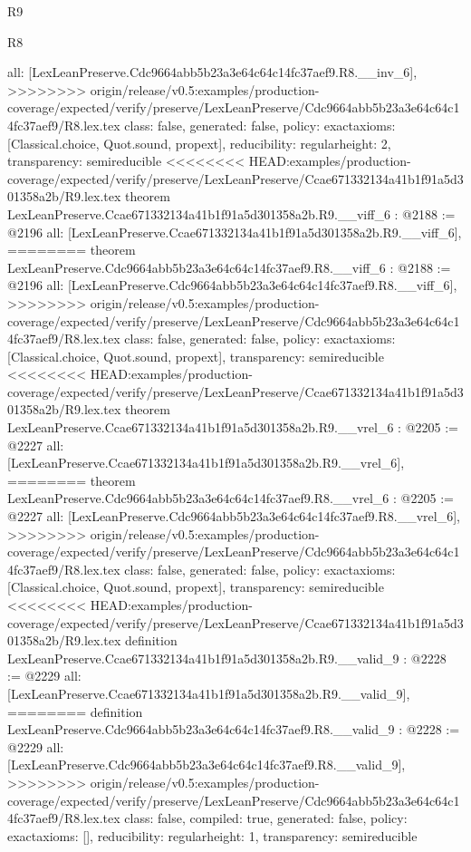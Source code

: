 \begin{lexlean}{R9}
\begin{lexlean}{R8}
\begin{coremodule}
{{{{{{{{{{{{  all: [LexLeanPreserve.Cdc9664abb5b23a3e64c64c14fc37aef9.R8.__inv_6],
>>>>>>>> origin/release/v0.5:examples/production-coverage/expected/verify/preserve/LexLeanPreserve/Cdc9664abb5b23a3e64c64c14fc37aef9/R8.lex.tex
  class: false,
  generated: false,
  policy: exact{axioms: [Classical.choice, Quot.sound, propext]},
  reducibility: regular{height: 2},
  transparency: semireducible
}
<<<<<<<< HEAD:examples/production-coverage/expected/verify/preserve/LexLeanPreserve/Ccae671332134a41b1f91a5d301358a2b/R9.lex.tex
theorem LexLeanPreserve.Ccae671332134a41b1f91a5d301358a2b.R9.__viff_6 : @2188 := @2196 {
  all: [LexLeanPreserve.Ccae671332134a41b1f91a5d301358a2b.R9.__viff_6],
========
theorem LexLeanPreserve.Cdc9664abb5b23a3e64c64c14fc37aef9.R8.__viff_6 : @2188 := @2196 {
  all: [LexLeanPreserve.Cdc9664abb5b23a3e64c64c14fc37aef9.R8.__viff_6],
>>>>>>>> origin/release/v0.5:examples/production-coverage/expected/verify/preserve/LexLeanPreserve/Cdc9664abb5b23a3e64c64c14fc37aef9/R8.lex.tex
  class: false,
  generated: false,
  policy: exact{axioms: [Classical.choice, Quot.sound, propext]},
  transparency: semireducible
}
<<<<<<<< HEAD:examples/production-coverage/expected/verify/preserve/LexLeanPreserve/Ccae671332134a41b1f91a5d301358a2b/R9.lex.tex
theorem LexLeanPreserve.Ccae671332134a41b1f91a5d301358a2b.R9.__vrel_6 : @2205 := @2227 {
  all: [LexLeanPreserve.Ccae671332134a41b1f91a5d301358a2b.R9.__vrel_6],
========
theorem LexLeanPreserve.Cdc9664abb5b23a3e64c64c14fc37aef9.R8.__vrel_6 : @2205 := @2227 {
  all: [LexLeanPreserve.Cdc9664abb5b23a3e64c64c14fc37aef9.R8.__vrel_6],
>>>>>>>> origin/release/v0.5:examples/production-coverage/expected/verify/preserve/LexLeanPreserve/Cdc9664abb5b23a3e64c64c14fc37aef9/R8.lex.tex
  class: false,
  generated: false,
  policy: exact{axioms: [Classical.choice, Quot.sound, propext]},
  transparency: semireducible
}
<<<<<<<< HEAD:examples/production-coverage/expected/verify/preserve/LexLeanPreserve/Ccae671332134a41b1f91a5d301358a2b/R9.lex.tex
definition LexLeanPreserve.Ccae671332134a41b1f91a5d301358a2b.R9.__valid_9 : @2228 := @2229 {
  all: [LexLeanPreserve.Ccae671332134a41b1f91a5d301358a2b.R9.__valid_9],
========
definition LexLeanPreserve.Cdc9664abb5b23a3e64c64c14fc37aef9.R8.__valid_9 : @2228 := @2229 {
  all: [LexLeanPreserve.Cdc9664abb5b23a3e64c64c14fc37aef9.R8.__valid_9],
>>>>>>>> origin/release/v0.5:examples/production-coverage/expected/verify/preserve/LexLeanPreserve/Cdc9664abb5b23a3e64c64c14fc37aef9/R8.lex.tex
  class: false,
  compiled: true,
  generated: false,
  policy: exact{axioms: []},
  reducibility: regular{height: 1},
  transparency: semireducible
}}}}}}}}}}}}}}}
\end{coremodule}
\end{lexlean}
\end{lexlean}
